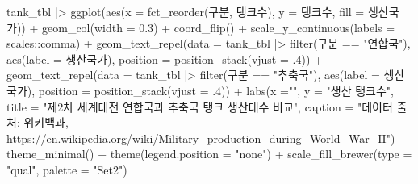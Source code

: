 \documentclass[
  letterpaper,
  chapter,a4paper,showtrims,openright,hidelinks]{oblivoir}
\newenvironment{Shaded}{\begin{snugshade}}{\end{snugshade}}
\newcommand{\AttributeTok}[1]{\textcolor[rgb]{0.40,0.45,0.13}{#1}}
\newcommand{\DecValTok}[1]{\textcolor[rgb]{0.68,0.00,0.00}{#1}}
\newcommand{\FloatTok}[1]{\textcolor[rgb]{0.68,0.00,0.00}{#1}}
\newcommand{\FunctionTok}[1]{\textcolor[rgb]{0.28,0.35,0.67}{#1}}
\newcommand{\NormalTok}[1]{\textcolor[rgb]{0.00,0.23,0.31}{#1}}
\newcommand{\SpecialCharTok}[1]{\textcolor[rgb]{0.37,0.37,0.37}{#1}}
\newcommand{\StringTok}[1]{\textcolor[rgb]{0.13,0.47,0.30}{#1}}
\begin{document}
\begin{Shaded}
\begin{Highlighting}[]
\NormalTok{tank\_tbl }\SpecialCharTok{|\textgreater{}} 
  \FunctionTok{ggplot}\NormalTok{(}\FunctionTok{aes}\NormalTok{(}\AttributeTok{x =} \FunctionTok{fct\_reorder}\NormalTok{(구분, 탱크수), }\AttributeTok{y =}\NormalTok{ 탱크수, }\AttributeTok{fill =}\NormalTok{ 생산국가)) }\SpecialCharTok{+}
    \FunctionTok{geom\_col}\NormalTok{(}\AttributeTok{width =} \FloatTok{0.3}\NormalTok{) }\SpecialCharTok{+}
    \FunctionTok{coord\_flip}\NormalTok{() }\SpecialCharTok{+}
    \FunctionTok{scale\_y\_continuous}\NormalTok{(}\AttributeTok{labels =}\NormalTok{ scales}\SpecialCharTok{::}\NormalTok{comma) }\SpecialCharTok{+}  
    \FunctionTok{geom\_text\_repel}\NormalTok{(}\AttributeTok{data =}\NormalTok{ tank\_tbl }\SpecialCharTok{|\textgreater{}} \FunctionTok{filter}\NormalTok{(구분 }\SpecialCharTok{==} \StringTok{"연합국"}\NormalTok{), }
              \FunctionTok{aes}\NormalTok{(}\AttributeTok{label =}\NormalTok{ 생산국가), }\AttributeTok{position =} \FunctionTok{position\_stack}\NormalTok{(}\AttributeTok{vjust =}\NormalTok{ .}\DecValTok{4}\NormalTok{)) }\SpecialCharTok{+}
    \FunctionTok{geom\_text\_repel}\NormalTok{(}\AttributeTok{data =}\NormalTok{ tank\_tbl }\SpecialCharTok{|\textgreater{}} \FunctionTok{filter}\NormalTok{(구분 }\SpecialCharTok{==} \StringTok{"추축국"}\NormalTok{), }
              \FunctionTok{aes}\NormalTok{(}\AttributeTok{label =}\NormalTok{ 생산국가), }\AttributeTok{position =} \FunctionTok{position\_stack}\NormalTok{(}\AttributeTok{vjust =}\NormalTok{ .}\DecValTok{4}\NormalTok{)) }\SpecialCharTok{+}  
    \FunctionTok{labs}\NormalTok{(}\AttributeTok{x =}\StringTok{""}\NormalTok{,}
         \AttributeTok{y =} \StringTok{"생산 탱크수"}\NormalTok{,}
         \AttributeTok{title =} \StringTok{"제2차 세계대전 연합국과 추축국 탱크 생산대수 비교"}\NormalTok{,}
         \AttributeTok{caption =} \StringTok{"데이터 출처: 위키백과, https://en.wikipedia.org/wiki/Military\_production\_during\_World\_War\_II"}\NormalTok{) }\SpecialCharTok{+}
    \FunctionTok{theme\_minimal}\NormalTok{()   }\SpecialCharTok{+}
    \FunctionTok{theme}\NormalTok{(}\AttributeTok{legend.position =} \StringTok{"none"}\NormalTok{) }\SpecialCharTok{+}
    \FunctionTok{scale\_fill\_brewer}\NormalTok{(}\AttributeTok{type =} \StringTok{"qual"}\NormalTok{, }\AttributeTok{palette =} \StringTok{"Set2"}\NormalTok{)}
\end{Highlighting}
\end{Shaded}
\end{document}
